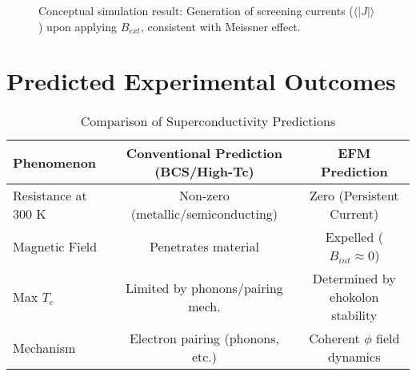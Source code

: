\documentclass[a4paper,12pt]{article}
\begin{document}
\begin{figure}[h]
    \centering
    \caption{Conceptual simulation result: Generation of screening currents (\(\langle |J| \rangle\)) upon applying \(B_{ext}\), consistent with Meissner effect.}
    \label{fig:sim_meissner}
\end{figure}


\section{Predicted Experimental Outcomes}
\begin{table}[h]
    \centering
    \caption{Comparison of Superconductivity Predictions}
    \label{tab:predictions}
    \begin{tabular}{@{}lcc@{}}
        \toprule
        Phenomenon & Conventional Prediction (BCS/High-Tc) & EFM Prediction \\
        \midrule
        Resistance at 300 K & Non-zero (metallic/semiconducting) & Zero (Persistent Current) \\
        Magnetic Field & Penetrates material & Expelled (\(B_{int} \approx 0\)) \\
        Max \(T_c\) & Limited by phonons/pairing mech. & Determined by ehokolon stability \\
        Mechanism & Electron pairing (phonons, etc.) & Coherent \(\phi\) field dynamics \\
        \bottomrule
    \end{tabular}
\end{table}
\end{document}
